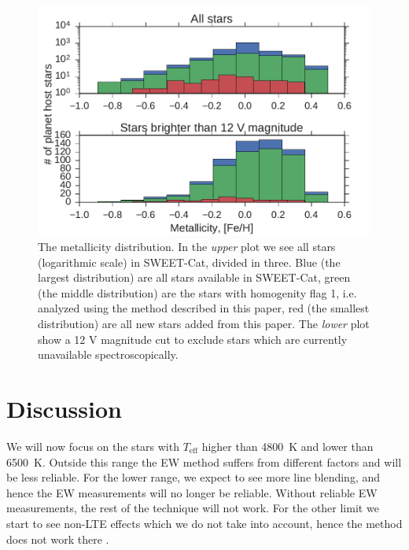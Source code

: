 \documentclass{aa}
\begin{document}
\begin{figure}[tpb]
    \centering
    \includegraphics[width=1.0\linewidth,natwidth=450,natheight=300]{figures/metallicityDistribution.pdf}
    \caption{The metallicity distribution. In the \emph{upper} plot we see all
             stars (logarithmic scale) in SWEET-Cat, divided in three. Blue
             (the largest distribution) are all stars available in SWEET-Cat,
             green (the middle distribution) are the stars with homogenity flag
             1, i.e. analyzed using the method described in this paper, red
             (the smallest distribution) are all new stars added from this
             paper. The \emph{lower} plot show a 12 V magnitude cut to exclude
             stars which are currently unavailable spectroscopically.}
    \label{fig:distribution}
\end{figure}



\section{Discussion}
\label{sec:Discussion}
We will now focus on the stars with $T_\mathrm{eff}$ higher than \SI{4800}{K}
and lower than \SI{6500}{K}. Outside this range the EW method suffers from
different factors and will be less reliable. For the lower range, we expect to
see more line blending, and hence the EW measurements will no longer be
reliable. Without reliable EW measurements, the rest of the technique will not
work. For the other limit we start to see non-LTE effects which we do not take
into account, hence the method does not work there \citep{Gray2006}.
\end{document}
